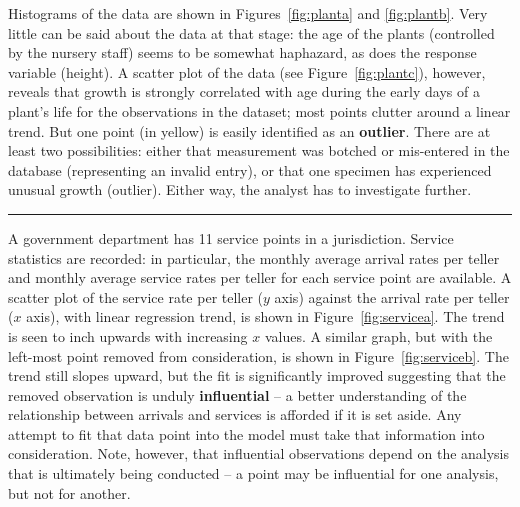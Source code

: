 Histograms of the data are shown in Figures~\ref{fig:planta} and \ref{fig:plantb}. Very little can be said about the data at that stage: the age of the plants (controlled by the nursery staff) seems to be somewhat haphazard, as does the response variable (height). A scatter plot of the data (see Figure~\ref{fig:plantc}), however, reveals that growth is strongly correlated with age during the early days of a plant's life for the observations in the dataset; most points clutter around a linear trend. But one point (in yellow) is easily identified as an \textbf{outlier}. There are at least two possibilities: either that measurement was botched or mis-entered in the database (representing an invalid entry), or that one specimen has experienced unusual growth (outlier). Either way, the analyst has to investigate further.  
\begin{center}
    \rule{0.5\textwidth}{.4pt}
\end{center}
A government department has 11 service points in a jurisdiction. Service statistics are recorded: in particular, the monthly average arrival rates per teller and monthly average service rates per teller for each service point are available. A scatter plot of the service rate per teller ($y$ axis) against the arrival rate per teller ($x$ axis), with linear regression trend, is shown in Figure~\ref{fig:servicea}. The trend is seen to inch upwards with increasing $x$ values. A similar graph, but with the left-most point removed from consideration, is shown in Figure~\ref{fig:serviceb}. The trend still slopes upward, but the fit is significantly improved suggesting that the removed observation is unduly \textbf{influential} -- a better understanding of the relationship between arrivals and services is afforded if it is set aside. Any attempt to fit that data point into the model must take that information into consideration. Note, however, that influential observations depend on the analysis that is ultimately being conducted -- a point may be influential for one analysis, but not for another.     
